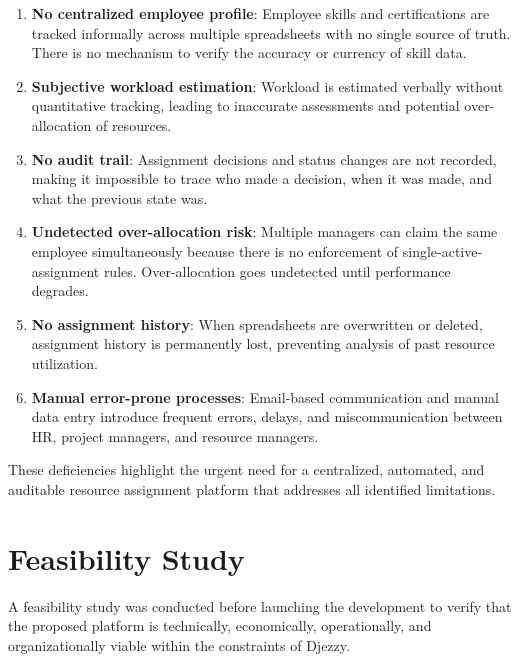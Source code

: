 \documentclass{bts-report}
\begin{document}
\begin{enumerate}
  \item \textbf{No centralized employee profile}: Employee skills and certifications are tracked informally across multiple spreadsheets with no single source of truth. There is no mechanism to verify the accuracy or currency of skill data.
  \item \textbf{Subjective workload estimation}: Workload is estimated verbally without quantitative tracking, leading to inaccurate assessments and potential over-allocation of resources.
  \item \textbf{No audit trail}: Assignment decisions and status changes are not recorded, making it impossible to trace who made a decision, when it was made, and what the previous state was.
  \item \textbf{Undetected over-allocation risk}: Multiple managers can claim the same employee simultaneously because there is no enforcement of single-active-assignment rules. Over-allocation goes undetected until performance degrades.
  \item \textbf{No assignment history}: When spreadsheets are overwritten or deleted, assignment history is permanently lost, preventing analysis of past resource utilization.
  \item \textbf{Manual error-prone processes}: Email-based communication and manual data entry introduce frequent errors, delays, and miscommunication between HR, project managers, and resource managers.
\end{enumerate}

These deficiencies highlight the urgent need for a centralized, automated, and auditable resource assignment platform that addresses all identified limitations.

\section{Feasibility Study}

A feasibility study was conducted before launching the development to verify that the proposed platform is technically, economically, operationally, and organizationally viable within the constraints of Djezzy.
\end{document}
